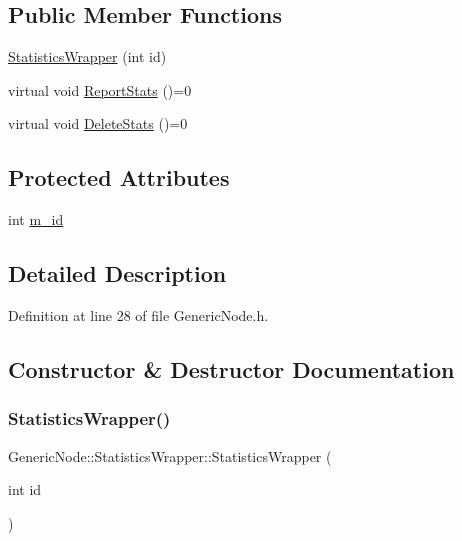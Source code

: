 \subsection*{Public Member Functions}
\begin{DoxyCompactItemize}
\item 
\hyperlink{class_generic_node_1_1_statistics_wrapper_a622a879b73b1607826c3bd5879366382}{Statistics\+Wrapper} (int id)
\item 
virtual void \hyperlink{class_generic_node_1_1_statistics_wrapper_a280ae59c2d5f64be5848335dc1b77c21}{Report\+Stats} ()=0
\item 
virtual void \hyperlink{class_generic_node_1_1_statistics_wrapper_a08f3642bccd77ccf4d7a8b7010559e1c}{Delete\+Stats} ()=0
\end{DoxyCompactItemize}
\subsection*{Protected Attributes}
\begin{DoxyCompactItemize}
\item 
int \hyperlink{class_generic_node_1_1_statistics_wrapper_a88b9f2826d0e737d9afc89a4f806535f}{m\+\_\+id}
\end{DoxyCompactItemize}


\subsection{Detailed Description}


Definition at line 28 of file Generic\+Node.\+h.



\subsection{Constructor \& Destructor Documentation}
\mbox{\label{class_generic_node_1_1_statistics_wrapper_a622a879b73b1607826c3bd5879366382}} 
\subsubsection{\texorpdfstring{Statistics\+Wrapper()}{StatisticsWrapper()}}
{\footnotesize\ttfamily Generic\+Node\+::\+Statistics\+Wrapper\+::\+Statistics\+Wrapper (\begin{DoxyParamCaption}\item[{int}]{id }\end{DoxyParamCaption})\hspace{0.3cm}{\ttfamily [inline]}}



